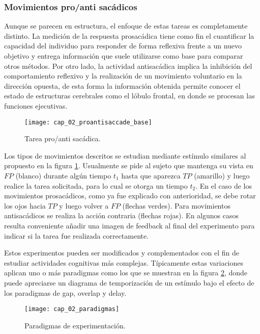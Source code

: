 \documentclass[../main.tex]{subfiles}
\begin{document}
			\vspace{-5mm}
			\subsubsection{Movimientos pro/anti sacádicos}
			\label{ssub:movimientos_pro_anti_sacadicos}
				Aunque se parecen en estructura, el enfoque de estas tareas es completamente distinto. La medición de la respuesta prosacádica tiene como fin el cuantificar la capacidad del individuo para responder de forma reflexiva frente a un nuevo objetivo y entrega información que suele utilizarse como base para comparar otros métodos. Por otro lado, la actividad antisacádica implica la inhibición del comportamiento reflexivo y la realización de un movimiento voluntario en la dirección opuesta, de esta forma la información obtenida permite conocer el estado de estructuras cerebrales como el lóbulo frontal, en donde se procesan las funciones ejecutivas.	
				\begin{figure}[H]
					\centering
					\texttt{[image: cap\_02\_proantisaccade\_base]}
					\caption{Tarea pro/anti sacádica.}
					\label{fig:02_pro_anti_saccade_base}
				\end{figure}  

				Los tipos de movimientos descritos se estudian mediante estímulo similares al propuesto en la figura \ref{fig:02_pro_anti_saccade_base}. Usualmente se pide al sujeto que mantenga su vista en $FP$ (blanco) durante algún tiempo $t_1$ hasta que aparezca $TP$ (amarillo) y luego realice la tarea solicitada, para lo cual se otorga un tiempo $t_2$. En el caso de los movimientos prosacádicos, como ya fue explicado con anterioridad, se debe rotar los ojos hacia $TP$ y luego volver a $FP$ (flechas verdes). Para movimientos antisacádicos se realiza la acción contraria (flechas rojas). En algunos casos resulta conveniente añadir una imagen de feedback al final del experimento para indicar si la tarea fue realizada correctamente. 

				Estos experimentos pueden ser modificados y complementados con el fin de estudiar actividades cognitivas más complejas. Típicamente estas variaciones aplican uno o más paradigmas como los que se muestran en la figura \ref{fig:02_paradigmas}, donde puede apreciarse un diagrama de temporización de un estímulo bajo el efecto de los paradigmas de gap, overlap y delay. 
				\begin{figure}[H]
					\centering
					\texttt{[image: cap\_02\_paradigmas]}
					\caption{Paradigmas de experimentación.}
					\label{fig:02_paradigmas}
				\end{figure} 
\end{document}

